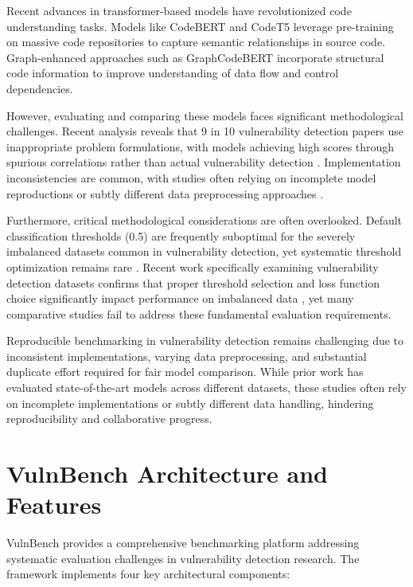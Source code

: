 \documentclass[letterpaper]{article}
\begin{document}
Recent advances in transformer-based models have revolutionized code understanding tasks. Models like CodeBERT \citep{feng2020codebert} and CodeT5 \citep{wang2021codet5} leverage pre-training on massive code repositories to capture semantic relationships in source code. Graph-enhanced approaches such as GraphCodeBERT \citep{guo2021graphcodebert} incorporate structural code information to improve understanding of data flow and control dependencies.

However, evaluating and comparing these models faces significant methodological challenges. Recent analysis reveals that 9 in 10 vulnerability detection papers use inappropriate problem formulations, with models achieving high scores through spurious correlations rather than actual vulnerability detection \citep{risse2025top}. Implementation inconsistencies are common, with studies often relying on incomplete model reproductions or subtly different data preprocessing approaches \citep{codecse2024}.

Furthermore, critical methodological considerations are often overlooked. Default classification thresholds (0.5) are frequently suboptimal for the severely imbalanced datasets common in vulnerability detection, yet systematic threshold optimization remains rare \citep{ghost2021, leevy2023optimal}. Recent work specifically examining vulnerability detection datasets confirms that proper threshold selection and loss function choice significantly impact performance on imbalanced data \citep{he2025imbalance}, yet many comparative studies fail to address these fundamental evaluation requirements.

Reproducible benchmarking in vulnerability detection remains challenging due to inconsistent implementations, varying data preprocessing, and substantial duplicate effort required for fair model comparison. While prior work has evaluated state-of-the-art models across different datasets, these studies often rely on incomplete implementations or subtly different data handling, hindering reproducibility and collaborative progress.

\section{VulnBench Architecture and Features}

VulnBench provides a comprehensive benchmarking platform addressing systematic evaluation challenges in vulnerability detection research. The framework implements four key architectural components:
\end{document}

